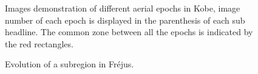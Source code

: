 \begin{figure}[htbp]
\begin{center}
{\begin{minipage}[t]{1\linewidth}
            \end{minipage}%
        }
        \caption{Images demonstration of different aerial epochs in Kobe, image number of each epoch is displayed in the parenthesis of each sub headline. The common zone between all the epochs is indicated by the red rectangles.}
        \label{KobeData}
    \end{center}
\end{figure} 


\begin{figure}[htbp]
	\begin{center}
		\caption{Evolution of a subregion in Fr{\'e}jus.}
		\label{FrejusEvolution}
	\end{center}
\end{figure} 

